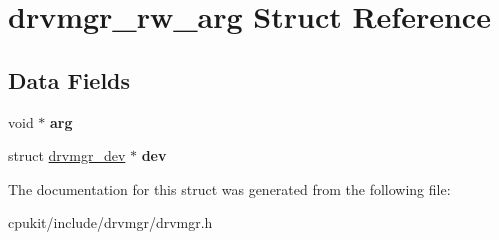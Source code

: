 \hypertarget{structdrvmgr__rw__arg}{}\section{drvmgr\+\_\+rw\+\_\+arg Struct Reference}
\label{structdrvmgr__rw__arg}
\subsection*{Data Fields}
\begin{DoxyCompactItemize}
\item 
\mbox{\label{structdrvmgr__rw__arg_ac6fbfa59cacb6b39345b884d717759af}} 
void $\ast$ {\bfseries arg}
\item 
\mbox{\label{structdrvmgr__rw__arg_ace6ac57b7f78eb503cc6e1a4e4c968df}} 
struct \mbox{\hyperlink{structdrvmgr__dev}{drvmgr\+\_\+dev}} $\ast$ {\bfseries dev}
\end{DoxyCompactItemize}


The documentation for this struct was generated from the following file\+:\begin{DoxyCompactItemize}
\item 
cpukit/include/drvmgr/drvmgr.\+h\end{DoxyCompactItemize}
